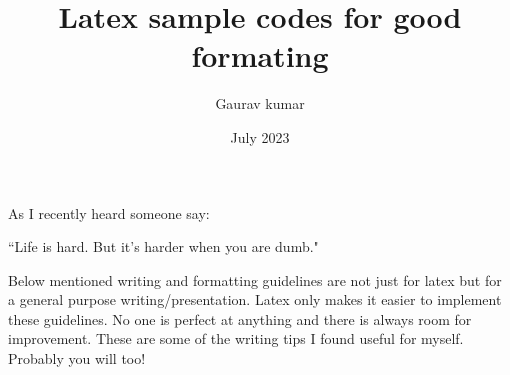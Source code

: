 \documentclass{article}
\title{Latex sample codes for good formating}
\author{Gaurav kumar}
\date{July 2023}
\begin{document}
\maketitle

As I recently heard someone say:

\begin{displayquote}
\centering
``Life is hard. But it's harder when you are dumb."
\end{displayquote}

Below mentioned writing and formatting guidelines are not just for latex but for a general purpose writing/presentation. Latex only makes it easier to implement these guidelines. No one is perfect at anything and there is always room for improvement. These are some of the writing tips I found useful for myself. Probably you will too!
\end{document}
